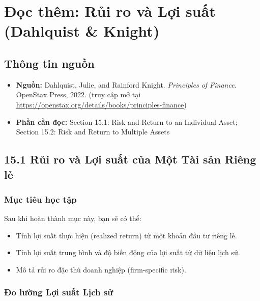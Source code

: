 \chapter{Đọc thêm: Rủi ro và Lợi suất (Dahlquist \& Knight)}
\label{ch:M3L1-reading1}


\section{Thông tin nguồn}

\begin{itemize}
  \item \textbf{Nguồn:} Dahlquist, Julie, and Rainford Knight. \emph{Principles of Finance}. OpenStax Press, 2022. (truy cập mở tại \url{https://openstax.org/details/books/principles-finance})
  \item \textbf{Phần cần đọc:} Section 15.1: Risk and Return to an Individual Asset; Section 15.2: Risk and Return to Multiple Assets
\end{itemize}

\section{15.1 Rủi ro và Lợi suất của Một Tài sản Riêng lẻ}

\subsection*{Mục tiêu học tập}
Sau khi hoàn thành mục này, bạn sẽ có thể:
\begin{itemize}
  \item Tính lợi suất thực hiện (realized return) từ một khoản đầu tư riêng lẻ.
  \item Tính lợi suất trung bình và độ biến động của lợi suất từ dữ liệu lịch sử.
  \item Mô tả rủi ro đặc thù doanh nghiệp (firm-specific risk).
\end{itemize}

\subsection*{Đo lường Lợi suất Lịch sử}

